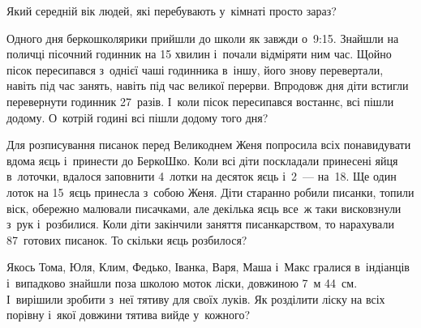 \problem
Який середній вік людей, які перебувають у~кімнаті просто зараз?


\problem
Одного дня беркошколярики прийшли до школи як завжди о~9:15.
Знайшли на поличці пісочний годинник на 15 хвилин і~почали відміряти ним час.
Щойно пісок пересипався з~однієї чаші годинника в~іншу,
його знову перевертали, навіть під час занять,
навіть під час великої перерви.
Впродовж дня діти встигли перевернути годинник 27~разів.
І~коли пісок пересипався востаннє, всі пішли додому.
О~котрій годині всі пішли додому того дня?


\problem
Для розписування писанок перед Великоднем Женя попросила всіх понавидувати
вдома яєць і~принести до БеркоШко. Коли всі діти поскладали принесені яйця
в~лоточки, вдалося заповнити 4~лотки на десяток яєць і~2~--- на~18.
Ще один лоток на 15~яєць принесла з~собою Женя.
Діти старанно робили писанки, топили віск, обережно малювали писачками,
але декілька яєць все~ж таки висковзнули з~рук і~розбилися.
Коли діти закінчили заняття писанкарством, то нарахували 87~готових писанок.
То скільки яєць розбилося?


\problem
Якось Тома, Юля, Клим, Федько, Іванка, Варя, Маша і~Макс гралися
в~індіанців і~випадково знайшли поза школою моток ліски, довжиною 7~м 44~см.
І~вирішили зробити з~неї тятиву для своїх луків.
Як розділити ліску на всіх порівну і~якої довжини тятива вийде у~кожного?
